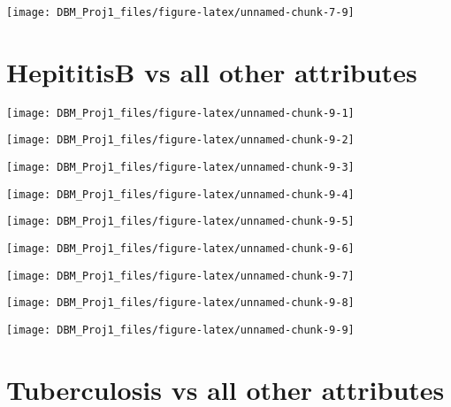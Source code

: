 \documentclass[
]{article}
\begin{document}
\begin{center}\texttt{[image: DBM\_Proj1\_files/figure-latex/unnamed-chunk-7-9]} \end{center}

\hypertarget{hepititisb-vs-all-other-attributes}{%
\section{HepititisB vs all other
attributes}\label{hepititisb-vs-all-other-attributes}}

\begin{center}\texttt{[image: DBM\_Proj1\_files/figure-latex/unnamed-chunk-9-1]} \end{center}

\begin{center}\texttt{[image: DBM\_Proj1\_files/figure-latex/unnamed-chunk-9-2]} \end{center}

\begin{center}\texttt{[image: DBM\_Proj1\_files/figure-latex/unnamed-chunk-9-3]} \end{center}

\begin{center}\texttt{[image: DBM\_Proj1\_files/figure-latex/unnamed-chunk-9-4]} \end{center}

\begin{center}\texttt{[image: DBM\_Proj1\_files/figure-latex/unnamed-chunk-9-5]} \end{center}

\begin{center}\texttt{[image: DBM\_Proj1\_files/figure-latex/unnamed-chunk-9-6]} \end{center}

\begin{center}\texttt{[image: DBM\_Proj1\_files/figure-latex/unnamed-chunk-9-7]} \end{center}

\begin{center}\texttt{[image: DBM\_Proj1\_files/figure-latex/unnamed-chunk-9-8]} \end{center}

\begin{center}\texttt{[image: DBM\_Proj1\_files/figure-latex/unnamed-chunk-9-9]} \end{center}

\hypertarget{tuberculosis-vs-all-other-attributes}{%
\section{Tuberculosis vs all other
attributes}\label{tuberculosis-vs-all-other-attributes}}
\end{document}
